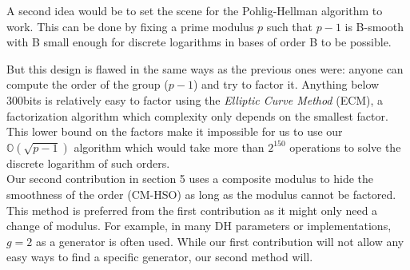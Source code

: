 \documentclass[a4paper,11pt,twocolumn]{article}
\begin{document}
A second idea would be to set the scene for the Pohlig-Hellman algorithm to work. This can be done by fixing a prime modulus $p$ such that $p-1$ is B-smooth  with B small enough for discrete logarithms in bases of order B to be possible.\\

\begin{center}
\end{center}

But this design is flawed in the same ways as the previous ones were: anyone can compute the order of the group ($p - 1$) and try to factor it. Anything below 300bits is relatively easy to factor using the \emph{Elliptic Curve Method} (ECM), a factorization algorithm which complexity only depends on the smallest factor. This lower bound on the factors make it impossible for us to use our $\mathbb{O}(\sqrt{p-1})$ algorithm which would take more than $2^{150}$ operations to solve the discrete logarithm of such orders. \\

Our second contribution in section 5 uses a composite modulus to hide the smoothness of the order (CM-HSO) as long as the modulus cannot be factored. This method is preferred from the first contribution as it might only need a change of modulus. For example, in many DH parameters or implementations, $g=2$ as a generator is often used. While our first contribution will not allow any easy ways to find a specific generator, our second method will.
\end{document}
